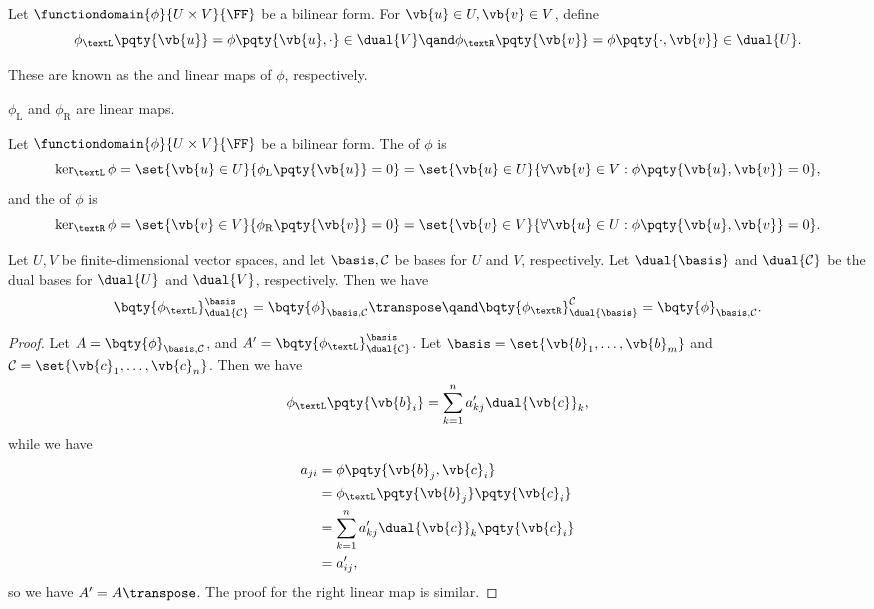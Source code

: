 \begin{definition}
    Let \(\functiondomain{\phi}{U \times V}{\FF}\) be a bilinear form. For \(\vb{u} \in U, \vb{v} \in V\), define
    \[
        \phi_{\textL} \pqty{\vb{u}} = \phi\pqty{\vb{u}, \cdot} \in \dual{V} \qand \phi_{\textR}\pqty{\vb{v}} = \phi\pqty{\cdot, \vb{v}} \in \dual{U}.
    \]  

    These are known as the  and  linear maps of \(\phi\), respectively.
\end{definition}

\begin{lemma}
    \label{lem:linearity-of-left-and-right-linear-maps}%
    \(\phi_{\text{L}}\) and \(\phi_{\text{R}}\) are linear maps.
\end{lemma}

\begin{definition}
    Let \(\functiondomain{\phi}{U \times V}{\FF}\) be a bilinear form. The  of \(\phi\) is
    \[
        \ker_{\textL} \phi = \set{\vb{u} \in U}{\phi_{\text{L}}\pqty{\vb{u}} = 0} = \set{\vb{u} \in U }{\forall \vb{v} \in V: \phi\pqty{\vb{u}, \vb{v}} = 0},
    \]
    and the  of \(\phi\) is
    \[
        \ker_{\textR} \phi = \set{\vb{v} \in V}{\phi_{\text{R}}\pqty{\vb{v}} = 0} = \set{\vb{v} \in V}{\forall \vb{u} \in U : \phi\pqty{\vb{u}, \vb{v}} = 0}.
    \]
\end{definition}

\begin{proposition}
    \label{prop:matrix-representation-left-right-linear-maps}%
    Let \(U, V\) be finite-dimensional vector spaces, and let \(\basis, \mathcal{C}\) be bases for \(U\) and \(V\), respectively. Let \(\dual{\basis}\) and \(\dual{\mathcal{C}}\) be the dual bases for \(\dual{U}\) and \(\dual{V}\), respectively. Then we have
    \[
        \bqty{\phi_{\textL}}^{\basis}_{\dual{\mathcal{C}}} = \bqty{\phi}_{\basis, \mathcal{C}}\transpose \qand \bqty{\phi_{\textR}}^{\mathcal{C}}_{\dual{\basis}} = \bqty{\phi}_{\basis, \mathcal{C}}.
    \]
\end{proposition}

\begin{proof}
    Let \(A = \bqty{\phi}_{\basis, \mathcal{C}}\), and \(A' = \bqty{\phi_{\textL}}^{\basis}_{\dual{\mathcal{C}}}\). Let \(\basis = \set{\vb{b}_1, \ldots, \vb{b}_m}\) and \(\mathcal{C} = \set{\vb{c}_1, \ldots, \vb{c}_n}\). Then we have
    \[
        \phi_{\textL}\pqty{\vb{b}_i} = \sum_{k = 1}^{n} a'_{kj} \dual{\vb{c}}_k,
    \]
    while we have
    \begin{align*}
        a_{ji} &= \phi \pqty{\vb{b}_j, \vb{c}_i} \\
        &= \phi_{\textL}\pqty{\vb{b}_j}\pqty{\vb{c}_i} \\
        &= \sum_{k = 1}^{n} a'_{kj} \dual{\vb{c}}_k\pqty{\vb{c}_i} \\
        &= a'_{ij},
    \end{align*}
    so we have \(A' = A\transpose\). The proof for the right linear map is similar.
\end{proof}

